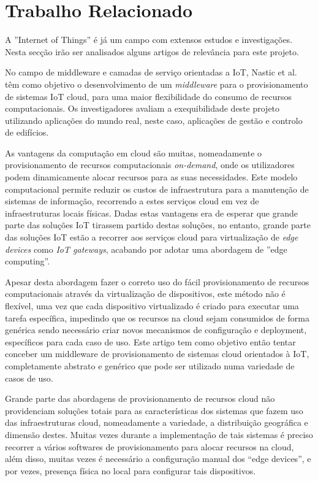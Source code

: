 \section{Trabalho Relacionado}
A ''Internet of Things'' é já um campo com extensos estudos e investigações. Nesta secção irão ser analisados alguns artigos de relevância para este projeto.


No campo de middleware e camadas de serviço orientadas a IoT, Nastic et al. \cite{iot-provision} têm como objetivo o desenvolvimento de um \textit{middleware} para o provisionamento de sistemas IoT cloud, para uma maior flexibilidade do consumo de recursos computacionais. Os investigadores avaliam a exequibilidade deste projeto utilizando aplicações do mundo real, neste caso, aplicações de gestão e controlo de edifícios.

As vantagens da computação em cloud são muitas, nomeadamente o provisionamento de recursos computacionais \textit{on-demand}, onde os utilizadores podem dinamicamente alocar recursos para as suas necessidades. Este modelo computacional permite reduzir os custos de infraestrutura para a manutenção de sistemas de informação, recorrendo a estes serviços cloud em vez de infraestruturas locais físicas. Dadas estas vantagens era de esperar que grande parte das soluções IoT tirassem partido destas soluções, no entanto, grande parte das soluções IoT estão a recorrer aos serviços cloud para virtualização de \textit{edge devices} como \textit{IoT gateways}, acabando por adotar uma abordagem de ''edge computing''.

Apesar desta abordagem fazer o correto uso do fácil provisionamento de recursos computacionais através da virtualização de dispositivos, este método não é flexível, uma vez que cada dispositivo virtualizado é criado para executar uma tarefa específica, impedindo que os recursos na cloud sejam consumidos de forma genérica sendo necessário criar novos mecanismos de configuração e deployment, específicos para cada caso de uso. Este artigo tem como objetivo então tentar conceber um middleware de provisionamento de sistemas cloud orientados à IoT, completamente abstrato e genérico que pode ser utilizado numa variedade de casos de uso.

Grande parte das abordagens de provisionamento de recursos cloud não providenciam soluções totais para as características dos sistemas que fazem uso das infraestruturas cloud, nomeadamente a variedade, a distribuição geográfica e dimensão destes. Muitas vezes durante a implementação de tais sistemas é preciso recorrer a vários softwares de provisionamento para alocar recursos na cloud, além disso,  muitas vezes é necessário a configuração manual dos “edge devices”, e por vezes, presença física no local para configurar tais dispositivos.


